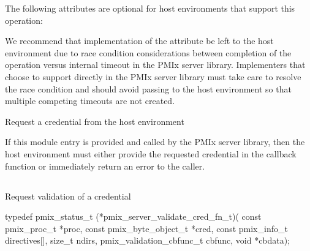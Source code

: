 \reqattrend

\optattrstart
The following attributes are optional for host environments that support this operation:


\optattrend

\adviceimplstart
We recommend that implementation of the  attribute be left to the host environment due to race condition considerations between completion of the operation versus internal timeout in the \ac{PMIx} server library. Implementers that choose to support  directly in the \ac{PMIx} server library must take care to resolve the race condition and should avoid passing  to the host environment so that multiple competing timeouts are not created.
\adviceimplend


\descr

Request a credential from the host environment

\advicermstart
If this module entry is provided and called by the \ac{PMIx} server library, then the host environment must either provide the requested credential in the callback function or immediately return an error to the caller.
\advicermend

\subsection{}

\summary

Request validation of a credential

\format

\cspecificstart
\begin{codepar}
typedef pmix_status_t (*pmix_server_validate_cred_fn_t)(
                             const pmix_proc_t *proc,
                             const pmix_byte_object_t *cred,
                             const pmix_info_t directives[],
                             size_t ndirs,
                             pmix_validation_cbfunc_t cbfunc,
                             void *cbdata);
\end{codepar}
\cspecificend

\begin{arglist}
\end{arglist}

